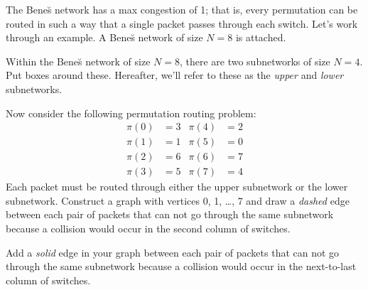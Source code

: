 \begin{problem}
The Bene\u{s} network has a max congestion of 1; that is, every
permutation can be routed in such a way that a single packet passes
through each switch.  Let's work through an example.  A Bene\u{s} network
of size $N = 8$ is attached.

\bparts

\ppart Within the Bene\u{s} network of size $N = 8$, there are two
subnetworks of size $N = 4$.  Put boxes around these.  Hereafter,
we'll refer to these as the \textit{upper} and \textit{lower}
subnetworks.

\begin{solution}

\begin{figure}[h]
\end{figure}

\end{solution}

\ppart Now consider the following permutation routing problem:
%
\begin{align*}
\pi(0) & = 3 & \pi(4) & = 2 \\
\pi(1) & = 1 & \pi(5) & = 0 \\
\pi(2) & = 6 & \pi(6) & = 7 \\
\pi(3) & = 5 & \pi(7) & = 4
\end{align*}
%
Each packet must be routed through either the upper subnetwork or the
lower subnetwork.  Construct a graph with vertices 0, 1, \ldots, 7 and
draw a \textit{dashed} edge between each pair of packets that can not
go through the same subnetwork because a collision would occur in the
second column of switches.

\begin{solution}

\begin{figure}[h]
\end{figure}

\end{solution}

\ppart Add a \textit{solid} edge in your graph between each pair of
packets that can not go through the same subnetwork because a
collision would occur in the next-to-last column of switches.

\begin{solution}

\begin{figure}[h]
\end{figure}


\end{solution}
\end{problem}
